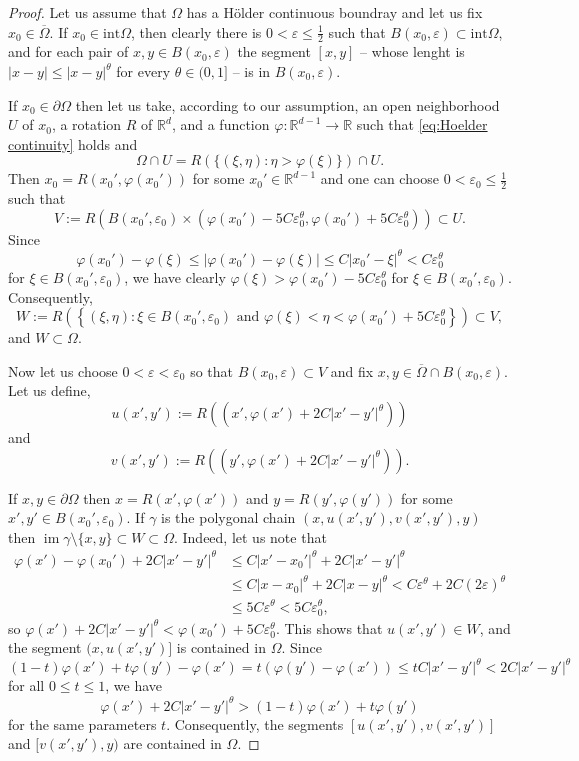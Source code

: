 \documentclass[10pt,leqno]{amsart}
\theoremstyle{definition}
\newcommand{\R}{\mathbb R}
\newcommand{\im}{\operatorname{im}}
\let\epsilon\varepsilon
\let\phi\varphi
\begin{document}
\begin{proof}
Let us assume that $\Omega$ has a H\"older continuous boundray and
let us fix $x_0\in\overline{\Omega}$. If $x_0\in\mathrm{int}\Omega$, then clearly there is $0<\epsilon\leq\frac{1}{2}$ such that $B(x_0,\epsilon)\subset\mathrm{int}\Omega$, and for each pair of $x,y\in B(x_0,\epsilon)$ the segment $[x,y]$ -- whose lenght is $|x-y|\leq|x-y|^\theta$ for every $\theta\in (0,1]$ -- is in $B(x_0,\epsilon)$.  

If $x_0\in\partial\Omega$ then let us take, according to our assumption, an open neighborhood $U$ of $x_0$, a rotation $R$ of $\R^d$, and a function $\phi\colon\R^{d-1}\to\R$ such that \eqref{eq:Hoelder continuity} holds and
$$\Omega\cap U=R(\{(\xi,\eta)\colon \eta>\phi(\xi)\})\cap U.$$
Then $x_0=R(x_0',\phi(x_0'))$ for some $x_0'\in\R^{d-1}$ 
and one can choose $0<\epsilon_0\leq\frac{1}{2}$ such that
$$V:=R\left(B(x_0',\epsilon_0)\times\left(\phi(x_0')-5C\epsilon_0^\theta,\phi(x_0')+5C\epsilon_0^\theta\right)\right)\subset U.$$
Since
$$\phi(x_0')-\phi(\xi)\leq |\phi(x_0')-\phi(\xi)|\leq C|x_0'-\xi|^\theta<C\epsilon_0^\theta$$
for $\xi\in B(x_0',\epsilon_0)$,
we have clearly
$\phi(\xi)>\phi(x_0')-5C\epsilon_0^\theta$ for $\xi\in B(x_0',\epsilon_0)$.
Consequently, 
$$W:=R\left(\left\{(\xi,\eta)\colon \xi\in B(x_0',\epsilon_0)\text{ and }\phi(\xi)<\eta<\phi(x_0')+5C\epsilon_0^\theta\right\}\right)\subset V,$$
and $W\subset\Omega$.

Now let us choose $0<\epsilon<\epsilon_0$ so that $B(x_0,\epsilon)\subset V$ and fix $x,y\in\overline{\Omega}\cap B(x_0,\epsilon)$. 
Let us define, 
$$u(x',y'):=R((x',\phi(x')+2C|x'-y'|^\theta))$$ 
and
$$v(x',y'):=R((y',\phi(x')+2C|x'-y'|^\theta)).$$

If $x,y\in\partial\Omega$ then $x=R(x',\phi(x'))$ and $y=R(y',\phi(y'))$ for some $x',y'\in B(x_0',\epsilon_0)$.
If $\gamma$ is the polygonal chain $(x,u(x',y'),v(x',y'),y)$
then $\im\gamma\setminus\{x,y\}\subset W\subset \Omega$. Indeed, let us note that
\begin{align*}
\phi(x')-\phi(x_0')+2C|x'-y'|^\theta&\leq C|x'-x_0'|^\theta+2C|x'-y'|^\theta\\ 
&\leq C|x-x_0|^\theta+2C|x-y|^\theta
<C\epsilon^\theta+2C(2\epsilon)^\theta\\
&\leq 5C\epsilon^\theta<5C\epsilon_0^\theta,
\end{align*}
so $\phi(x')+2C|x'-y'|^\theta<\phi(x_0')+5C\epsilon_0^\theta$. This shows that $u(x',y')\in W$, and the segment $(x,u(x',y')]$ is contained in $\Omega$. Since
$$(1-t)\phi(x')+t\phi(y')-\phi(x')=t(\phi(y')-\phi(x'))\leq tC|x'-y'|^\theta<2C|x'-y'|^\theta$$
for all $0\leq t\leq1$, we have
$$\phi(x')+2C|x'-y'|^\theta>(1-t)\phi(x')+t\phi(y')$$
for the same parameters $t$.
Consequently, the segments $[u(x',y'),v(x',y')]$ and $[v(x',y'),y)$ are contained in $\Omega$.



\end{proof}
\end{document}
